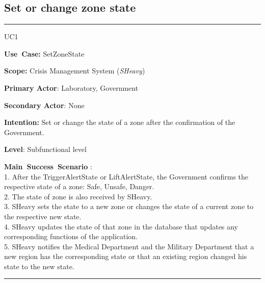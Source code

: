 \subsection{Set or change zone state}
\vspace{0.5cm}
\hrule
\vspace{0.5cm}
\begin{lyxlist}{UC1}
\small{
\item [\textbf{Use~Case:}] SetZoneState
\item [\textbf{Scope:}] Crisis Management System (\emph{SHeavy})
\item [\textbf{Primary Actor}:] Laboratory, Government
\item [\textbf{Secondary Actor}:] None
\item [\textbf{Intention:}] Set or change the state of a zone 
after the confirmation of the Government.
\item [\textbf{Level}:]Subfunctional level
\item [\textbf{Main~Success~Scenario}]:\\
1. After the TriggerAlertState or LiftAlertState, the Government confirms
 the respective state of a zone: Safe, Unsafe, Danger.\\
2. The state of zone is also received by SHeavy.\\
3. SHeavy sets the state to a new zone or changes the state of a current zone to 
the respective new state.\\
4. SHeavy updates the state of that zone in the database that updates any
corresponding functions of the application.\\
5. SHeavy notifies the Medical Department and the Military Department that a new 
region has the corresponding state or that an existing region changed his state
to the new state.\\
}
\end{lyxlist}
\hrule
\vspace{0.5cm} 

